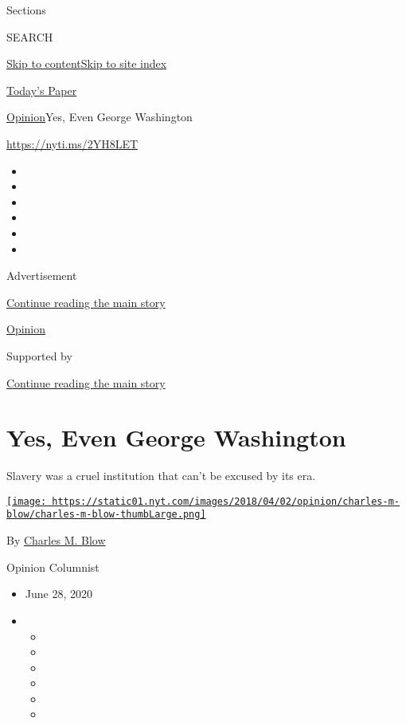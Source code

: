 Sections

SEARCH

\protect\hyperlink{site-content}{Skip to
content}\protect\hyperlink{site-index}{Skip to site index}

\href{https://myaccount.nytimes.com/auth/login?response_type=cookie\&client_id=vi}{}

\href{https://www.nytimes.com/section/todayspaper}{Today's Paper}

\href{/section/opinion}{Opinion}\textbar{}Yes, Even George Washington

\url{https://nyti.ms/2YH8LET}

\begin{itemize}
\item
\item
\item
\item
\item
\item
\end{itemize}

Advertisement

\protect\hyperlink{after-top}{Continue reading the main story}

\href{/section/opinion}{Opinion}

Supported by

\protect\hyperlink{after-sponsor}{Continue reading the main story}

\hypertarget{yes-even-george-washington}{%
\section{Yes, Even George Washington}\label{yes-even-george-washington}}

Slavery was a cruel institution that can't be excused by its era.

\href{https://www.nytimes.com/by/charles-m-blow}{\texttt{[image: https://static01.nyt.com/images/2018/04/02/opinion/charles-m-blow/charles-m-blow-thumbLarge.png]}}

By \href{https://www.nytimes.com/by/charles-m-blow}{Charles M. Blow}

Opinion Columnist

\begin{itemize}
\item
  June 28, 2020
\item
  \begin{itemize}
  \item
  \item
  \item
  \item
  \item
  \item
  \end{itemize}
\end{itemize}

